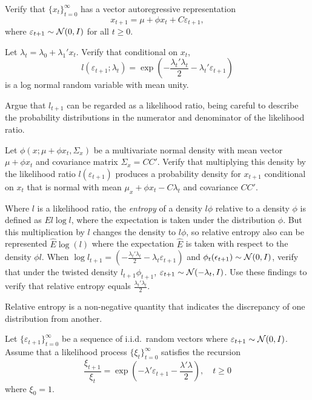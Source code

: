 \medskip
{} Verify that $\{x_t\}_{t=0}^\infty$ has a vector autoregressive representation
$$ x_{t+1} = \mu + \phi x_t + C \varepsilon_{t+1} ,$$
where $\varepsilon_{t+1} \sim {\cal N}(0,I)$ for all $t\geq 0$.

\medskip

  Let $\lambda_t = \lambda_0 + \lambda_1' x_t$. Verify that conditional on $x_t$,
$$ l(\varepsilon_{t+1}; \lambda_t) = \exp( - {\frac{\lambda_t' \lambda_t}{2}} - \lambda_t' \varepsilon_{t+1}) $$
is a log normal random variable with mean unity.

\medskip
{}  Argue that $l_{t+1}$ can be regarded as a likelihood ratio, being careful to describe the probability distributions
in the numerator and denominator of the likelihood ratio.
\medskip

  Let $\phi(x; \mu + \phi x_t, \Sigma_x)$ be a multivariate normal density with mean vector $\mu + \phi x_t$ and covariance matrix $\Sigma_x = C C'$.
Verify that multiplying this density by the likelihood ratio $l(\varepsilon_{t+1})$ produces a probability density for $x_{t+1}$ conditional
on $x_t$ that is normal with mean $\mu_x + \phi x_t - C \lambda_t$ and covariance $C C'$.

\medskip
{} Where $l$ is a likelihood ratio, the {\it entropy\/} of a density $l \phi$ relative to a density $\phi$ is
defined as $ E l \log l $, where the expectation is taken under the distribution $\phi$.  But this multiplication by $l$ changes the
density to $l \phi$, so relative entropy also can be represented $\hat E \log (l) $ where the expectation $\hat E$ is taken with respect to
the density $\phi l$.  When $\log l_{t+1} = (-{\frac{\lambda_t' \lambda_t}{2}} - \lambda_t \varepsilon_{t+1}) $ and $\phi_t(\epsilon_{t+1}) \sim {\cal N}(0,I)$,
verify that under the  twisted density $ l_{t+1} \phi_{t+1}$,
$\varepsilon_{t+1} \sim {\cal N}( - \lambda_t , I)$.  Use these findings to verify that relative entropy equals
$ {\frac{\lambda_t' \lambda_t}{2}}$.

\medskip
{} Relative entropy is a non-negative quantity that indicates the discrepancy of one distribution from another.


\medskip

 
\medskip
\noindent Let $\{\varepsilon_{t+1} \}_{t=0}^\infty$ be a sequence of i.i.d.\ random vectors where $\varepsilon_{t+1} \sim {\cal N}(0,I)$.
Assume that a likelihood process $\{\xi_{t}\}_{t=0}^\infty$  satisfies the recursion
$$ {\frac{\xi_{t+1}}{\xi_t}} = \exp ( - \lambda' \varepsilon_{t+1} - {\frac{\lambda' \lambda}{2}} ), \quad t \geq 0  $$
where $\xi_0 = 1$.

